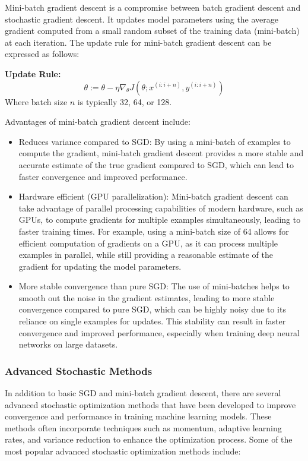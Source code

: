 \documentclass[
  letterpaper,
  DIV=11,
  numbers=noendperiod]{scrreprt}
\begin{document}
Mini-batch gradient descent is a compromise between batch gradient
descent and stochastic gradient descent. It updates model parameters
using the average gradient computed from a small random subset of the
training data (mini-batch) at each iteration. The update rule for
mini-batch gradient descent can be expressed as follows:

\textbf{Update Rule:} \[
\theta := \theta - \eta \nabla_\theta J(\theta; x^{(i:i+n)}, y^{(i:i+n)})
\] Where batch size \(n\) is typically 32, 64, or 128.

Advantages of mini-batch gradient descent include:

\begin{itemize}
\item
  Reduces variance compared to SGD: By using a mini-batch of examples to
  compute the gradient, mini-batch gradient descent provides a more
  stable and accurate estimate of the true gradient compared to SGD,
  which can lead to faster convergence and improved performance.
\item
  Hardware efficient (GPU parallelization): Mini-batch gradient descent
  can take advantage of parallel processing capabilities of modern
  hardware, such as GPUs, to compute gradients for multiple examples
  simultaneously, leading to faster training times. For example, using a
  mini-batch size of 64 allows for efficient computation of gradients on
  a GPU, as it can process multiple examples in parallel, while still
  providing a reasonable estimate of the gradient for updating the model
  parameters.
\item
  More stable convergence than pure SGD: The use of mini-batches helps
  to smooth out the noise in the gradient estimates, leading to more
  stable convergence compared to pure SGD, which can be highly noisy due
  to its reliance on single examples for updates. This stability can
  result in faster convergence and improved performance, especially when
  training deep neural networks on large datasets.
\end{itemize}

\subsubsection{Advanced Stochastic
Methods}\label{advanced-stochastic-methods}

In addition to basic SGD and mini-batch gradient descent, there are
several advanced stochastic optimization methods that have been
developed to improve convergence and performance in training machine
learning models. These methods often incorporate techniques such as
momentum, adaptive learning rates, and variance reduction to enhance the
optimization process. Some of the most popular advanced stochastic
optimization methods include:
\end{document}
